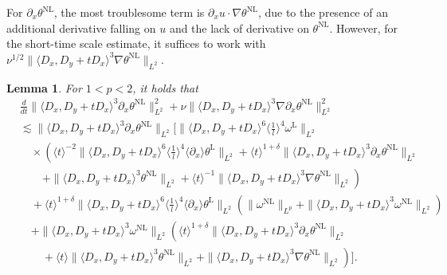 \documentclass[reqno, 12pt]{amsart} %
\theoremstyle{plain} %
\newtheorem{Lem}[Thm]{Lemma}     %
\theoremstyle{definition}
\theoremstyle{remark}
\numberwithin{equation}{section} %
\newcommand{\lt}{\left}
\newcommand{\rt}{\right}
\newcommand{\px}{\partial_x}
\begin{document}
	
	For $\px \theta^{\mathrm{NL}}$, the most troublesome term is $\px u \cdot \nabla \theta^{\mathrm{NL}}$, due to the presence of an additional derivative falling on $u$ and the lack of derivative on $\theta^{\mathrm{NL}}$. However, for the short-time scale estimate, it suffices to work with 
	$
	\nu^{1/2 }\|\langle D_x, D_y+t D_x\rangle^3 \nabla \theta^{\mathrm{NL}}\|_{L^2}.
	$
	\begin{Lem} \label{lem:est of pxtheta L2}
		For $1<p<2$, it holds that
		\begin{equation*}\begin{aligned}
				&\frac{d}{d t}\|\langle D_x, D_y+t D_x\rangle^3 \px \theta^{\mathrm{NL}}\|_{L^2}^2+\nu\|\langle D_x, D_y+t D_x\rangle^3 \nabla \px \theta^{\mathrm{NL}}\|_{L^2}^2 \\
				&\lesssim \|\langle D_x, D_y+t D_x\rangle^3 \px \theta^{\mathrm{NL}}\|_{L^2} \bigg[ \|\langle D_x, D_y+t D_x\rangle^6  \langle\frac{1}{l}\rangle^4  \omega^{\mathrm{L}}\|_{L^2} \\
				& \quad  \times \lt( \langle t \rangle^{-2} \|\langle D_x, D_y+t D_x\rangle^6  \langle\frac{1}{l}\rangle^4 \langle \px\rangle \theta^{\mathrm{L}}\|_{L^2}  + \langle t \rangle^{1+ \delta} \|\langle D_x, D_y+t D_x\rangle^3 \px \theta^{\mathrm{NL}}\|_{L^2}  \rt.\\
				&\lt. \quad \quad +   \|\langle D_x, D_y+t D_x\rangle^3 \theta^{\mathrm{NL}}\|_{L^2}  +  \langle t \rangle^{-1} \|\langle D_x, D_y+t D_x\rangle^3 \nabla \theta^{\mathrm{NL}}\|_{L^2} \rt)   \\
				& \quad + \langle t \rangle^{1+ \delta}  \|\langle D_x, D_y+t D_x\rangle^6  \langle\frac{1}{l}\rangle^4 \langle \px\rangle \theta^{\mathrm{L}}\|_{L^2}  \lt(  \|\omega^{\mathrm{NL}}\|_{L^p}   + \|\langle D_x, D_y+t D_x\rangle^3 \omega^{\mathrm{NL}}\|_{L^2} \rt)  \\
				&\quad  +   \|\langle D_x, D_y+t D_x\rangle^3 \omega^{\mathrm{NL}}\|_{L^2} \lt( \langle t \rangle^{1+ \delta}  \|\langle D_x, D_y+t D_x\rangle^3 \px \theta^{\mathrm{NL}}\|_{L^2}   \rt. \\
				&\lt. \qquad +  \langle t \rangle   \|\langle D_x, D_y+t D_x\rangle^3 \theta^{\mathrm{NL}}\|_{L^2} +  \|\langle D_x, D_y+t D_x\rangle^3 \nabla \theta^{\mathrm{NL}}\|_{L^2} \rt)\bigg] .
		\end{aligned}\end{equation*}
	\end{Lem}
\end{document}
